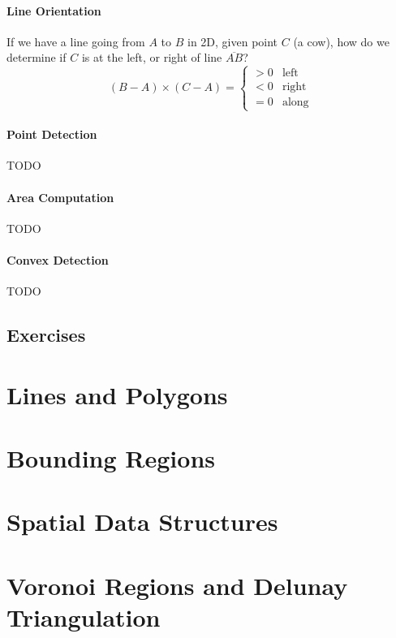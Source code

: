 \documentclass[12pt]{report}
\begin{document}
	\subsubsection{Line Orientation}
	
	If we have a line going from $A$ to $B$ in 2D, given point $C$ (a cow), how do we determine if $C$ is at the left, or right of line $\overline{AB}$?
	$$
	(B - A) \times (C - A) = \begin{cases}
	> 0 & \text{left}\\
	< 0 & \text{right}\\
	= 0 & \text{along}
	\end{cases}
	$$
	\subsubsection{Point Detection}
	TODO
	\subsubsection{Area Computation}
	TODO
	\subsubsection{Convex Detection}
	TODO
\section{Exercises}

\chapter{Lines and Polygons}
\chapter{Bounding Regions}
\chapter{Spatial Data Structures}
\chapter{Voronoi Regions and Delunay Triangulation}
\end{document}
